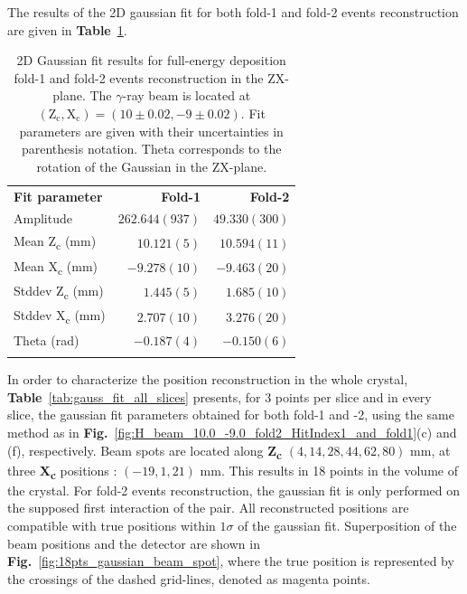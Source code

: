 The results of the 2D gaussian fit for both fold-1 and fold-2 events reconstruction are given in \textbf{Table}~\ref{tab:gaussian_fit_results_combined}.

\begin{table}[ht]
\centering
\caption{2D Gaussian fit results for full-energy deposition fold-1 and fold-2 events reconstruction in the ZX-plane. The $\gamma$-ray beam is located at $(\text{Z}_\text{c}, \text{X}_\text{c}) = (10\pm0.02, -9\pm0.02)$. Fit parameters are given with their uncertainties in parenthesis notation. Theta corresponds to the rotation of the Gaussian in the ZX-plane.}
\label{tab:gaussian_fit_results_combined}
\begin{tabular}{lrr}
\hline\noalign{\smallskip}
\textbf{Fit parameter} & \textbf{Fold-1} & \textbf{Fold-2} \\
\noalign{\smallskip}\hline\noalign{\smallskip}
Amplitude & $262.644(937)$ & $49.330(300)$ \\
Mean Z\textsubscript{c} (mm) & $10.121(5)$ & $10.594(11)$ \\
Mean X\textsubscript{c} (mm) & $-9.278(10)$ & $-9.463(20)$ \\
Stddev Z\textsubscript{c} (mm) & $1.445(5)$ & $1.685(10)$ \\
Stddev X\textsubscript{c} (mm) & $2.707(10)$ & $3.276(20)$ \\
Theta (rad) & $-0.187(4)$ & $-0.150(6)$ \\
\noalign{\smallskip}\hline
\end{tabular}
\end{table}

In order to characterize the position reconstruction in the whole crystal, \textbf{Table}~\ref{tab:gauss_fit_all_slices} presents, for 3 points per slice and in every slice, the gaussian fit parameters obtained for both fold-1 and -2, using the same method as in \textbf{Fig.}~\ref{fig:H_beam_10.0_-9.0_fold2_HitIndex1_and_fold1}(c) and (f), respectively. Beam spots are located along \textbf{Z\textsubscript{c}} $(4, 14, 28, 44, 62, 80)$ mm, at three \textbf{X\textsubscript{c}} positions : $(-19, 1, 21)$ mm. This results in 18 points in the volume of the crystal. For fold-2 events reconstruction, the gaussian fit is only performed on the supposed first interaction of the pair. All reconstructed positions are compatible with true positions within $1\sigma$ of the gaussian fit. Superposition of the beam positions and the detector are shown in \textbf{Fig.}~\ref{fig:18pts_gaussian_beam_spot}, where the true position is represented by the crossings of the dashed grid-lines, denoted as magenta points.

